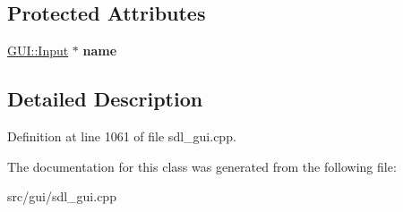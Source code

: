 \subsection*{Protected Attributes}
\begin{DoxyCompactItemize}
\item 
\hypertarget{classSetLocalSize_a04b30f6369fc83b25a0047080f78fa2c}{\hyperlink{classGUI_1_1Input}{G\-U\-I\-::\-Input} $\ast$ {\bfseries name}}\label{classSetLocalSize_a04b30f6369fc83b25a0047080f78fa2c}

\end{DoxyCompactItemize}


\subsection{Detailed Description}


Definition at line 1061 of file sdl\-\_\-gui.\-cpp.



The documentation for this class was generated from the following file\-:\begin{DoxyCompactItemize}
\item 
src/gui/sdl\-\_\-gui.\-cpp\end{DoxyCompactItemize}
